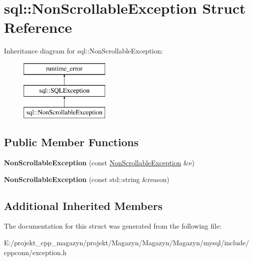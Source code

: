 \hypertarget{structsql_1_1_non_scrollable_exception}{}\section{sql\+:\+:Non\+Scrollable\+Exception Struct Reference}
\label{structsql_1_1_non_scrollable_exception}
Inheritance diagram for sql\+:\+:Non\+Scrollable\+Exception\+:\begin{figure}[H]
\begin{center}
\leavevmode
\includegraphics[height=3.000000cm]{structsql_1_1_non_scrollable_exception}
\end{center}
\end{figure}
\subsection*{Public Member Functions}
\begin{DoxyCompactItemize}
\item 
\hypertarget{structsql_1_1_non_scrollable_exception_a1f863bfa3628a5ddaca62698a5ccab72}{}\label{structsql_1_1_non_scrollable_exception_a1f863bfa3628a5ddaca62698a5ccab72} 
{\bfseries Non\+Scrollable\+Exception} (const \hyperlink{structsql_1_1_non_scrollable_exception}{Non\+Scrollable\+Exception} \&e)
\item 
\hypertarget{structsql_1_1_non_scrollable_exception_aac07e20cf83068adcee940c28dd3de72}{}\label{structsql_1_1_non_scrollable_exception_aac07e20cf83068adcee940c28dd3de72} 
{\bfseries Non\+Scrollable\+Exception} (const std\+::string \&reason)
\end{DoxyCompactItemize}
\subsection*{Additional Inherited Members}


The documentation for this struct was generated from the following file\+:\begin{DoxyCompactItemize}
\item 
E\+:/projekt\+\_\+cpp\+\_\+magazyn/projekt/\+Magazyn/\+Magazyn/\+Magazyn/mysql/include/cppconn/exception.\+h\end{DoxyCompactItemize}
